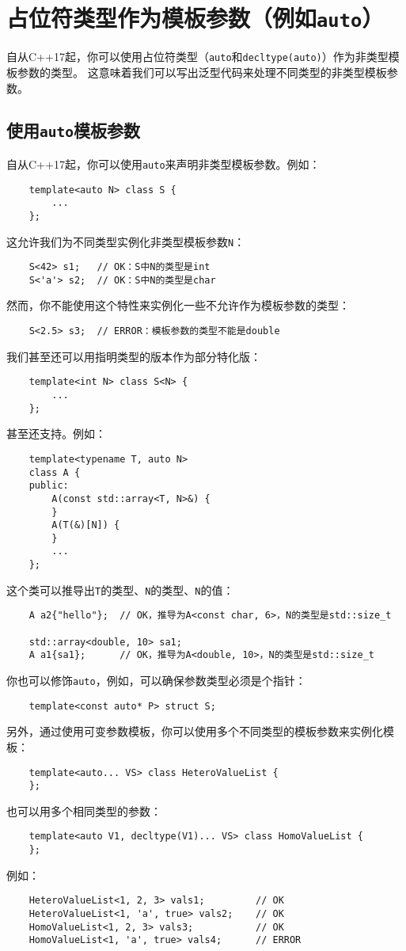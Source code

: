 \chapter[占位符类型作为模板参数]{占位符类型作为模板参数（例如\texttt{auto}）}\label{ch13}
自从C++17起，你可以使用占位符类型（\texttt{auto}和\texttt{decltype(auto)}）作为非类型模板参数的类型。
这意味着我们可以写出泛型代码来处理不同类型的非类型模板参数。

\section{使用\texttt{auto}模板参数}\label{ch13.1}
自从C++17起，你可以使用\texttt{auto}来声明非类型模板参数。例如：
\begin{lstlisting}
    template<auto N> class S {
        ...
    };
\end{lstlisting}
这允许我们为不同类型实例化非类型模板参数\texttt{N}：
\begin{lstlisting}
    S<42> s1;   // OK：S中N的类型是int
    S<'a'> s2;  // OK：S中N的类型是char
\end{lstlisting}
然而，你不能使用这个特性来实例化一些不允许作为模板参数的类型：
\begin{lstlisting}
    S<2.5> s3;  // ERROR：模板参数的类型不能是double
\end{lstlisting}
我们甚至还可以用指明类型的版本作为部分特化版：
\begin{lstlisting}
    template<int N> class S<N> {
        ...
    };
\end{lstlisting}
甚至还支持。例如：
\begin{lstlisting}
    template<typename T, auto N>
    class A {
    public:
        A(const std::array<T, N>&) {
        }
        A(T(&)[N]) {
        }
        ...
    };
\end{lstlisting}
这个类可以推导出\texttt{T}的类型、\texttt{N}的类型、\texttt{N}的值：
\begin{lstlisting}
    A a2{"hello"};  // OK，推导为A<const char, 6>，N的类型是std::size_t

    std::array<double, 10> sa1;
    A a1{sa1};      // OK，推导为A<double, 10>，N的类型是std::size_t
\end{lstlisting}
你也可以修饰\texttt{auto}，例如，可以确保参数类型必须是个指针：
\begin{lstlisting}
    template<const auto* P> struct S;
\end{lstlisting}
另外，通过使用可变参数模板，你可以使用多个不同类型的模板参数来实例化模板：
\begin{lstlisting}
    template<auto... VS> class HeteroValueList {
    };
\end{lstlisting}
也可以用多个相同类型的参数：
\begin{lstlisting}
    template<auto V1, decltype(V1)... VS> class HomoValueList {
    };
\end{lstlisting}
例如：
\begin{lstlisting}
    HeteroValueList<1, 2, 3> vals1;         // OK
    HeteroValueList<1, 'a', true> vals2;    // OK
    HomoValueList<1, 2, 3> vals3;           // OK
    HomoValueList<1, 'a', true> vals4;      // ERROR
\end{lstlisting}

